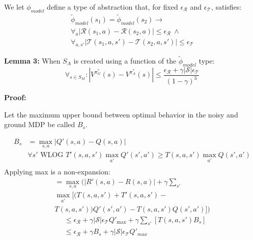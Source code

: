 \documentclass{article}
\newcommand{\ep}{\widetilde \phi}
\begin{document}
We let $\phi_{model}$ define a type of abstraction that, for fixed $\epsilon_\mathcal{R}$ and $\epsilon_\mathcal{T}$, satisfies:
\begin{multline}
\ep_{model}(s_1) = \ep_{model}(s_2) \rightarrow \\
\forall_a \left|\mathcal{R}(s_1, a) - \mathcal{R}(s_2, a)\right| \leq \epsilon_\mathcal{R}\ \wedge\ \\
\forall_{a,s'} \left|\mathcal{T}(s_1, a,s') - \mathcal{T}(s_2, a,s')\right| \leq \epsilon_\mathcal{T}
\end{multline}

{\bf Lemma 3:} When $S_A$ is created using a function of the $\ep_{model}$ type:
\begin{equation}
\forall_{s \in S_M} : | V^{\pi^*_G}(s) - V^{\pi^*_{A}}(s) | \leq \frac{{\epsilon_{\mathcal{R}}} + \gamma |\mathcal{S}|\epsilon_{\mathcal{T}}}{(1-\gamma)^3}
\end{equation}

{\bf Proof:}

Let the maximum upper bound between optimal behavior in the noisy and ground MDP be called $B_s$.

\begin{align*}
B_{s} &= \max_{s,a}|Q'(s,a)-Q(s,a)|\\
&\forall s' \text{ WLOG } T'(s,a,s')\max_{a'}Q'(s',a') \geq T(s,a,s')\max_{a'}Q(s',a')\\
\end{align*}
Applying max is a non-expansion:
\begin{multline}
=\max_{s,a}(|R'(s,a)-R(s,a)| + \gamma \sum_{s'} \\
\max_{a'} [(T(s,a,s')+T'(s,a,s')- \\ T(s,a,s'))Q'(s', a')-T(s,a,s')Q(s',a')])
\end{multline}
\begin{align*}
&\leq \epsilon_{\mathcal{R}}+\gamma |\mathcal{S}|\epsilon_{\mathcal{T}}Q'_{\text{max}} + \gamma \sum_{s'}\left[ T(s,a,s') B_s\right]\\
&\leq \epsilon_{\mathcal{R}} + \gamma B_{s} + \gamma |\mathcal{S}|\epsilon_{\mathcal{T}}Q'_{max}
\end{align*}
\end{document}
